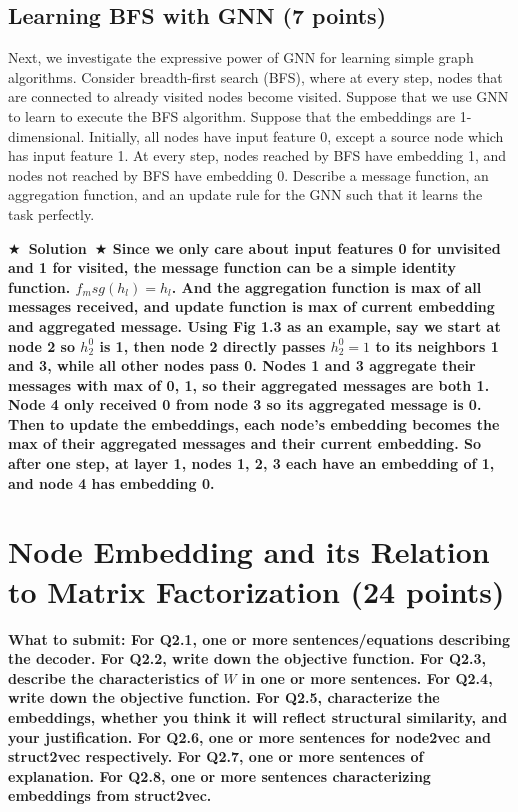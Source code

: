 \documentclass{article}
\numberwithin{figure}{section}
\newcommand{\Solution}[1]{{\medskip \color{red} \bf $\bigstar$~\sf \textbf{Solution}~$\bigstar$ \sf #1 } \bigskip}
\begin{document}
\subsection{Learning BFS with GNN (7 points)}

Next, we investigate the expressive power of GNN for learning simple graph algorithms. Consider breadth-first search (BFS), where at every step, nodes that are connected to already visited nodes become visited. Suppose that we use GNN to learn to execute the BFS algorithm. Suppose that the embeddings are 1-dimensional. Initially, all nodes have input feature 0, except a source node which has input feature 1. At every step, nodes reached by BFS have embedding 1, and nodes not reached by BFS have embedding 0. Describe a message function, an aggregation function, and an update rule for the GNN such that it learns the task perfectly.

\Solution{Since we only care about input features 0 for unvisited and 1 for visited, the message function can be a simple identity function. $f_msg(h_l) = h_l $.
And the aggregation function is max of all messages received, and update function is max of current embedding and aggregated message.
Using Fig 1.3 as an example,
say we start at node 2 so $h_2^0$ is 1, then node 2 directly passes $h_2^0 = 1$ to its neighbors 1 and 3, while all other nodes pass 0.
Nodes 1 and 3 aggregate their messages with max of {0, 1}, so their aggregated messages are both 1. Node 4 only received 0 from node 3 so its aggregated message is 0.
Then to update the embeddings, each node's embedding becomes the max of their aggregated messages and their current embedding.
So after one step, at layer 1, nodes 1, 2, 3 each have an embedding of 1, and node 4 has embedding 0. 
}



\section{Node Embedding and its Relation to Matrix Factorization (24 points)}

\textbf{ What to submit: For Q2.1, one or more sentences/equations describing the decoder. For Q2.2, write down the objective function. For Q2.3, describe the characteristics of $W$ in one or more sentences. For Q2.4, write down the objective function. For Q2.5, characterize the embeddings, whether you think it will reflect structural similarity, and your justification. For Q2.6, one or more sentences for node2vec and struct2vec respectively. For Q2.7, one or more sentences of explanation. For Q2.8, one or more sentences characterizing embeddings from struct2vec.}
\end{document}
